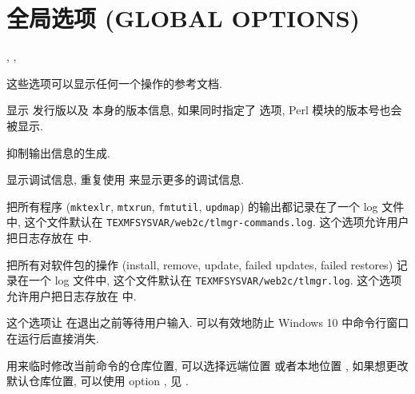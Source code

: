 \section[全局选项]{全局选项 (GLOBAL OPTIONS)}
\begin{description}
    \item {}, , \par
    这些选项可以显示任何一个操作的参考文档. 
    \item {}\par
    显示 \tl 发行版以及 \tlmgr 本身的版本信息, 如果同时指定了  选项, \tl{} Perl 模块的版本号也会被显示. 
    \item {}\par
    抑制输出信息的生成. 
    \item {}\par
    显示调试信息, 重复使用  来显示更多的调试信息. 
    \item {} \par
    \tlmgr 把所有程序 (\texttt{mktexlr}, \texttt{mtxrun}, \texttt{fmtutil}, \texttt{updmap}) 的输出都记录在了一个 log 文件中, 这个文件默认在 \texttt{TEXMFSYSVAR/web2c/tlmgr-commands.log}. 这个选项允许用户把日志存放在  中. 
    \item {} \par
    \tlmgr 把所有对软件包的操作 (\ac{install}, \ac{remove}, \ac{update}, failed updates, failed restores) 记录在一个 log 文件中, 这个文件默认在 \texttt{TEXMFSYSVAR/web2c/tlmgr.log}. 这个选项允许用户把日志存放在  中. 
    \item {}\par
    这个选项让 \tlmgr 在退出之前等待用户输入. 可以有效地防止 Windows 10 中命令行窗口在运行后直接消失. 
    \item {} \par
    用来临时修改当前命令的仓库位置, 可以选择远端位置  或者本地位置 , 如果想更改默认仓库位置, 可以使用 \tlmgr{} \ac{option} , 见 . 
\end{description}
